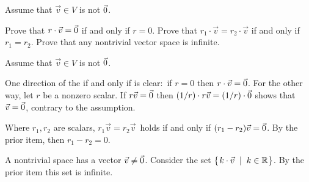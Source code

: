 
\begin{Exercise}[
name={},
title={}, 
difficulty=0,
origin={\cite{JH}}]

Assume that \( \vec{v}\in V \) is not \( \vec{0} \).

\Question Prove that \( r\cdot\vec{v}=\vec{0} \) if and only if \( r=0 \).
\Question Prove that \( r_1\cdot\vec{v}=r_2\cdot\vec{v} \) if
and only if \( r_1=r_2 \).
\Question Prove that any nontrivial vector space is infinite.

 
\end{Exercise}

\begin{Answer}

Assume that \( \vec{v}\in V \) is not \( \vec{0} \).
        
\Question One direction of the if and only if is clear:~if $r=0$
then $r\cdot\vec{v}=\vec{0}$.
For the other way, let \( r \) be a nonzero scalar.
If \( r\vec{v}=\vec{0} \) then
\( (1/r)\cdot r\vec{v}=(1/r)\cdot \vec{0} \) shows that
$\vec{v}=\vec{0}$,  contrary to the assumption.

\Question Where \( r_1,r_2 \) are scalars,
\( r_1\vec{v}=r_2\vec{v}\, \)
holds if and only if \( (r_1-r_2)\vec{v}=\vec{0} \).
By the prior item, then \( r_1-r_2=0 \).

\Question A nontrivial space has a vector
\( \vec{v}\neq\vec{0} \).
Consider the set \( \mbox{$\left\{\hspace{0.1em}k\cdot\vec{v}\;\;\middle|\;\; k\in\mathbb{R}\hspace{0.1em}\right\}$} \).
By the prior item this set is infinite.

\end{Answer}
